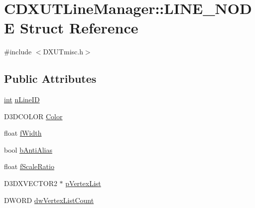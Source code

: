 \hypertarget{struct_c_d_x_u_t_line_manager_1_1_l_i_n_e___n_o_d_e}{
\section{CDXUTLineManager::LINE\_\-NODE Struct Reference}
\label{struct_c_d_x_u_t_line_manager_1_1_l_i_n_e___n_o_d_e}
}


{\ttfamily \#include $<$DXUTmisc.h$>$}\subsection*{Public Attributes}
\begin{DoxyCompactItemize}
\item 
\hyperlink{_d_x_u_tgui_8cpp_a2d77ed03302b6978834ee3b6f57837fb}{int} \hyperlink{struct_c_d_x_u_t_line_manager_1_1_l_i_n_e___n_o_d_e_a8688dc63f9f2bf94da6ff1d580debf99}{nLineID}
\item 
D3DCOLOR \hyperlink{struct_c_d_x_u_t_line_manager_1_1_l_i_n_e___n_o_d_e_ac5eb34ee677c6233a271904320ab5cc6}{Color}
\item 
float \hyperlink{struct_c_d_x_u_t_line_manager_1_1_l_i_n_e___n_o_d_e_aeaff8df971cd783d13902dbd4297d095}{fWidth}
\item 
bool \hyperlink{struct_c_d_x_u_t_line_manager_1_1_l_i_n_e___n_o_d_e_a5afd5e9697e25b5a2a27aaa5943ce683}{bAntiAlias}
\item 
float \hyperlink{struct_c_d_x_u_t_line_manager_1_1_l_i_n_e___n_o_d_e_a04167bd21ca4aa7480780e6ded9daa25}{fScaleRatio}
\item 
D3DXVECTOR2 $\ast$ \hyperlink{struct_c_d_x_u_t_line_manager_1_1_l_i_n_e___n_o_d_e_a2932a50dd89ddd73d3cd6964e0aec83e}{pVertexList}
\item 
DWORD \hyperlink{struct_c_d_x_u_t_line_manager_1_1_l_i_n_e___n_o_d_e_a1cca2772a871388faee3fd3e544babee}{dwVertexListCount}
\end{DoxyCompactItemize}


